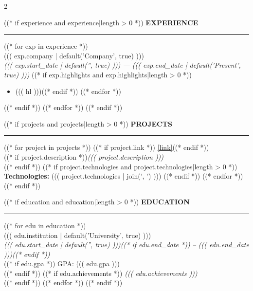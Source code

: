 \documentclass[11pt,a4paper]{article}
\newcommand{\redsection}[1]{%
  \vspace{9pt}
  {\fontsize{11}{13}\selectfont\bfseries\color{deepred}\MakeUppercase{#1}}\\[-1pt]
  {\color{deepred}\rule{\linewidth}{0.5pt}}
  \vspace{6pt}
}
\begin{document}
\begin{multicols}{2}

((* if experience and experience|length > 0 *))
\redsection{Experience}
((* for exp in experience *))
\\
{\small\color{muted} ((( exp.company | default('Company', true) )))}\\
{\small\color{muted}\textit{((( exp.start_date | default('', true) ))) --- ((( exp.end_date | default('Present', true) )))}}
((* if exp.highlights and exp.highlights|length > 0 *))
\begin{itemize}[leftmargin=12pt, itemsep=1pt, parsep=0pt, topsep=3pt]
((* for hl in exp.highlights *))((* if hl *))\item {\small ((( hl )))}((* endif *))
((* endfor *))
\end{itemize}
((* endif *))
\vspace{6pt}
((* endfor *))
((* endif *))

((* if projects and projects|length > 0 *))
\redsection{Projects}
((* for project in projects *))
((* if project.link *)) {\scriptsize\href{((* if 'http' not in project.link *))https://((* endif *))((( project.link )))}{[link]}}((* endif *))\\
((* if project.description *)){\small\textit{((( project.description )))}}\\((* endif *))
((* if project.technologies and project.technologies|length > 0 *))
{\small\textbf{Technologies:} ((( project.technologies | join(', ') )))}
((* endif *))
\vspace{4pt}
((* endfor *))
((* endif *))

\columnbreak

((* if education and education|length > 0 *))
\redsection{Education}
((* for edu in education *))
\\
{\small\color{muted} ((( edu.institution | default('University', true) )))}\\
{\small\color{muted}\textit{((( edu.start_date | default('', true) )))((* if edu.end_date *)) -- ((( edu.end_date )))((* endif *))}}\\[8pt]
((* if edu.gpa *))
{\small GPA: ((( edu.gpa )))}\\
((* endif *))
((* if edu.achievements *))
{\small\textit{((( edu.achievements )))}}\\
((* endif *))
((* endfor *))
((* endif *))


\end{multicols}
\end{document}

